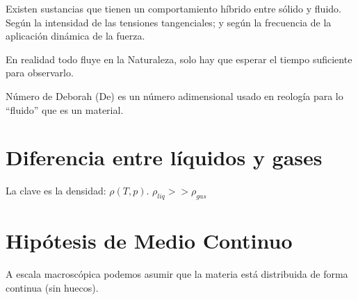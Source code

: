 Existen sustancias que tienen un comportamiento híbrido entre sólido y fluido. Según la intensidad de las tensiones tangenciales; y según la frecuencia de la aplicación dinámica de la fuerza.

En realidad todo fluye en la Naturaleza, solo hay que esperar el tiempo suficiente para observarlo.

Número de Deborah (De) es un número adimensional usado en reología para lo ``fluido'' que es un material.

\section{Diferencia entre líquidos y gases}
La clave es la densidad: $\rho(T, p)$. $\rho_{liq} >> \rho_{gas}$

\section{Hipótesis de Medio Continuo}
A escala macroscópica podemos asumir que la materia está distribuida de forma continua (sin huecos).
